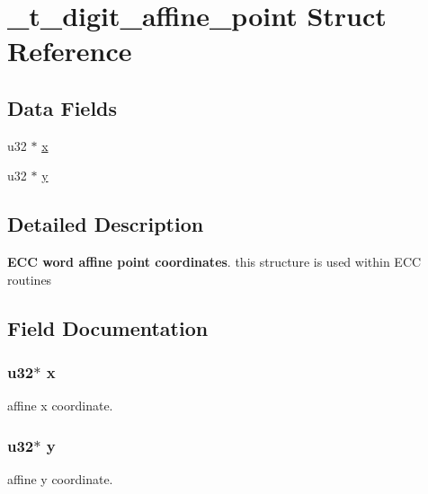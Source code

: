 \hypertarget{struct__t__digit__affine__point}{\section{\+\_\+t\+\_\+digit\+\_\+affine\+\_\+point Struct Reference}
\label{struct__t__digit__affine__point}
}
\subsection*{Data Fields}
\begin{DoxyCompactItemize}
\item
u32 $\ast$ \hyperlink{struct__t__digit__affine__point_afb22ef172fe0d1819b8a567bc4f9d0a8}{x}
\item
u32 $\ast$ \hyperlink{struct__t__digit__affine__point_a7c48a39466ef1e0a5be106b297e920b5}{y}
\end{DoxyCompactItemize}


\subsection{Detailed Description}
{\bfseries E\+C\+C word affine point coordinates}. this structure is used within E\+C\+C routines

\subsection{Field Documentation}
\hypertarget{struct__t__digit__affine__point_afb22ef172fe0d1819b8a567bc4f9d0a8}{
\subsubsection[{x}]{\setlength{\rightskip}{0pt plus 5cm}u32$\ast$ x}}\label{struct__t__digit__affine__point_afb22ef172fe0d1819b8a567bc4f9d0a8}
affine x coordinate. \hypertarget{struct__t__digit__affine__point_a7c48a39466ef1e0a5be106b297e920b5}{
\subsubsection[{y}]{\setlength{\rightskip}{0pt plus 5cm}u32$\ast$ y}}\label{struct__t__digit__affine__point_a7c48a39466ef1e0a5be106b297e920b5}
affine y coordinate. 